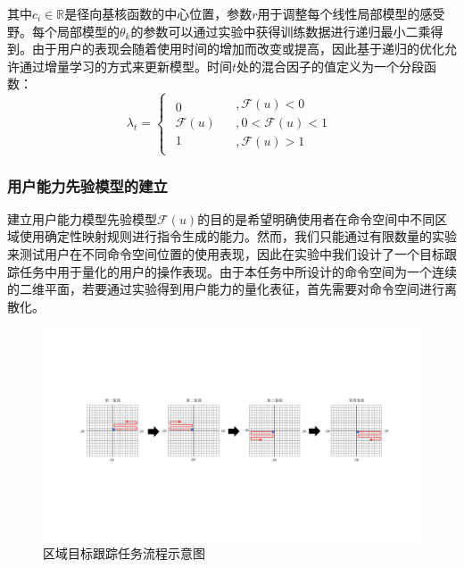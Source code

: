 其中$c_i \in \mathbb{R}$是径向基核函数的中心位置，参数$r$用于调整每个线性局部模型的感受野。每个局部模型的${\theta }_k$的参数可以通过实验中获得训练数据进行递归最小二乘得到。由于用户的表现会随着使用时间的增加而改变或提高，因此基于递归的优化允许通过增量学习的方式来更新模型。时间$t$处的混合因子的值定义为一个分段函数：
\begin{equation}
    \label{ex9}
    {\lambda _t} = \left \{{\begin{array}{*{20}{c}}
        {\begin{array}{*{20}{c}}
        0  \\  
        {\mathcal{F} (u)}  \\  
        1 
      \end{array}}&{\begin{array}{*{20}{c}}
        {,\mathcal{F} (u) < 0}  \\  
        {,0 < \mathcal{F} (u) < 1}  \\  
        {,\mathcal{F} (u) > 1} 
      \end{array}} 
      \end{array}} \right.
\end{equation}

\subsubsection{用户能力先验模型的建立}建立用户能力模型先验模型$\mathcal{F}(u)$的目的是希望明确使用者在命令空间中不同区域使用确定性映射规则进行指令生成的能力。然而，我们只能通过有限数量的实验来测试用户在不同命令空间位置的使用表现，因此在实验中我们设计了一个目标跟踪任务中用于量化的用户的操作表现。由于本任务中所设计的命令空间为一个连续的二维平面，若要通过实验得到用户能力的量化表征，首先需要对命令空间进行离散化。
\begin{figure}[htb]
    \includegraphics[width=1\textwidth]{figures/3-Fig-8.pdf}
    \caption{区域目标跟踪任务流程示意图}
    \label{fig:3-8}
\end{figure}

